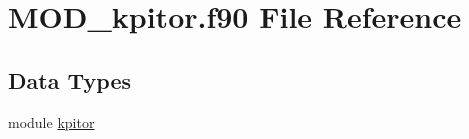 \hypertarget{MOD__kpitor_8f90}{\section{M\-O\-D\-\_\-kpitor.\-f90 File Reference}
\label{MOD__kpitor_8f90}
}
\subsection*{Data Types}
\begin{DoxyCompactItemize}
\item 
module \hyperlink{classkpitor}{kpitor}
\end{DoxyCompactItemize}
